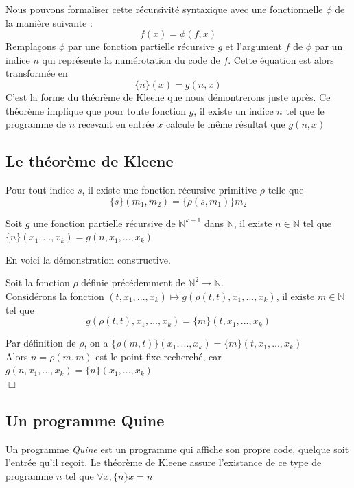 Nous pouvons formaliser cette récursivité syntaxique avec une fonctionnelle $\phi$ de la manière suivante :
$$
f(x)=\phi(f,x)
$$
Remplaçons $\phi$ par une fonction partielle récursive $g$ et l'argument $f$ de $\phi$ par un indice $n$ qui représente la numérotation 
du code de $f$. Cette équation est alors transformée en 
$$ \{n\}(x)=g(n,x)$$
C'est la forme du théorème de Kleene que nous démontrerons juste après. Ce théorème implique que pour toute fonction $g$,
il existe un indice $n$ tel que  le programme de $n$ recevant en entrée $x$ calcule le même résultat que $g(n,x)$	

\subsection{Le théorème de Kleene}
\begin{theoreme}[S-M-N]
Pour tout indice $s$, il existe une fonction récursive primitive $\rho$ telle que 
$$ \{s\}(m_1,m_2) = \{\rho(s,m_1)\}m_2 $$
\end{theoreme}

\begin{theoreme}[Kleene]
Soit $g$ une fonction partielle récursive de $\mathbb{N}^{k+1}$ dans $\mathbb{N}$, il existe
$n \in \mathbb{N}$ tel que $\{n\}(x_1, ..., x_k) = g (n,x_1, ...,x_k)$
\end{theoreme}

En voici  la démonstration constructive. 

Soit la fonction $\rho$ définie précédemment de $\mathbb{N}^2 \rightarrow \mathbb{N}.$ \\
Considérons la fonction $ (t,x_1,...,x_k) \mapsto g(\rho(t,t), x_1, ..., x_k) $,
il existe  $m \in \mathbb{N}$ tel que $$g(\rho(t,t),x_1, ...,x_k) = \{m\}(t, x_1, ..., x_k)$$ 

Par définition de $\rho$, on a $\{ \rho(m,t)\}(x_1,...,x_k)=\{m\}(t,x_1,...,x_k)$ \\
Alors $n=\rho(m,m)$ est le point fixe recherché, car
$g(n,x_1,...,x_k)=\{n\}(x_1,...,x_k)$ \\ $ \Box $


\subsection{Un programme Quine}
Un programme \textit{Quine} est un programme qui affiche son propre code, quelque soit l'entrée qu'il reçoit.
Le théorème de Kleene assure l'existance de ce type de programme $n$ tel que $\forall x, \{n\}x=n $

